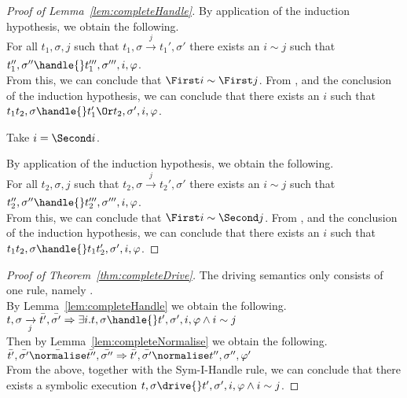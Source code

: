 \begin{proof}[Proof of Lemma~\ref{lem:completeHandle}]
{{    By application of the induction hypothesis, we obtain the following.\\
    For all $t_1,\sigma,j$ such that $t_1,\sigma\xrightarrow[]{j}t_1',\sigma'$ there exists an $i\sim j$ such that $t_1'',\sigma''\handle{}t_1''',\sigma''',i,\phi$.\\

    From this, we can conclude that $\First i\sim \First j$.
    From , and the conclusion of the induction hypothesis,
    we can conclude that there exists an $i$ such that $t_1\And t_2,\sigma\handle{}t_1'\Or t_2,\sigma',i,\phi$.
    }
    {
    Take $i=\Second i$.

    By application of the induction hypothesis, we obtain the following.\\
    For all $t_2,\sigma,j$ such that $t_2,\sigma\xrightarrow[]{j}t_2',\sigma'$ there exists an $i\sim j$ such that $t_2'',\sigma''\handle{}t_2''',\sigma''',i,\phi$.\\

    From this, we can conclude that $\First i\sim \Second j$.
    From , and the conclusion of the induction hypothesis,
    we can conclude that there exists an $i$ such that $t_1\And t_2,\sigma\handle{}t_1\And t_2',\sigma',i,\phi$.
    }
    }

\end{proof}



\begin{proof}[Proof of Theorem~\ref{thm:completeDrive}]
  The driving semantics only consists of one rule, namely .\\
  By Lemma~\ref{lem:completeHandle} we obtain the following.\\
  $t,\sigma\xrightarrow[j]{}\bar{t'},\bar{\sigma'}\implies \exists i . t,\sigma\handle{}t',\sigma',i,\phi \land i\sim j$\\
  Then by Lemma~\ref{lem:completeNormalise} we obtain the following.\\
  $\bar{t'},\bar{\sigma'}\bar{\normalise}\bar{t''},\bar{\sigma''}\implies \bar{t'},\bar{\sigma'}\normalise t'',\sigma'',\phi'$\\
  From the above, together with the Sym-I-Handle rule, we can conclude that there exists a symbolic execution $t,\sigma\drive{} t',\sigma',i,\phi\land i\sim j$.

\end{proof}
